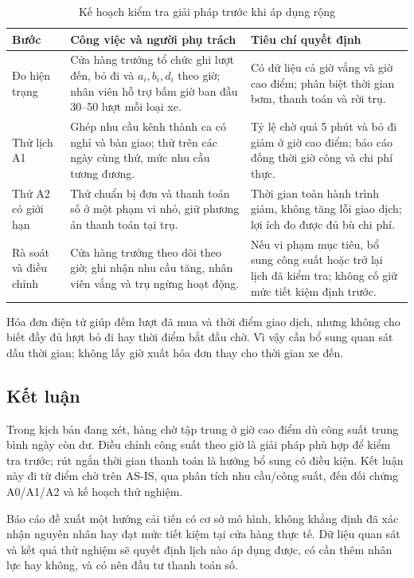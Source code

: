 \begin{table}[htbp]\centering\small
\caption{Kế hoạch kiểm tra giải pháp trước khi áp dụng rộng}\label{r3:pilot}
\begin{tabularx}{\linewidth}{@{}p{26mm}Y Y@{}}
\toprule
Bước & Công việc và người phụ trách & Tiêu chí quyết định \\
\midrule
Đo hiện trạng & Cửa hàng trưởng tổ chức ghi lượt đến, bỏ đi và $a_i,b_i,d_i$ theo giờ; nhân viên hỗ trợ bấm giờ ban đầu 30--50 lượt mỗi loại xe. & Có dữ liệu cả giờ vắng và giờ cao điểm; phân biệt thời gian bơm, thanh toán và rời trụ. \\
Thử lịch A1 & Ghép nhu cầu kênh thành ca có nghỉ và bàn giao; thử trên các ngày cùng thứ, mức nhu cầu tương đương. & Tỷ lệ chờ quá 5 phút và bỏ đi giảm ở giờ cao điểm; báo cáo đồng thời giờ công và chi phí thực. \\
Thử A2 có giới hạn & Thử chuẩn bị đơn và thanh toán số ở một phạm vi nhỏ, giữ phương án thanh toán tại trụ. & Thời gian toàn hành trình giảm, không tăng lỗi giao dịch; lợi ích đo được đủ bù chi phí. \\
Rà soát và điều chỉnh & Cửa hàng trưởng theo dõi theo giờ; ghi nhận nhu cầu tăng, nhân viên vắng và trụ ngừng hoạt động. & Nếu vi phạm mục tiêu, bổ sung công suất hoặc trở lại lịch đã kiểm tra; không cố giữ mức tiết kiệm định trước. \\
\bottomrule
\end{tabularx}
\end{table}
Hóa đơn điện tử giúp đếm lượt đã mua và thời điểm giao dịch, nhưng không
cho biết đầy đủ lượt bỏ đi hay thời điểm bắt đầu chờ. Vì vậy cần bổ sung
quan sát dấu thời gian; không lấy giờ xuất hóa đơn thay cho thời gian xe đến.

\subsection{Kết luận}
Trong kịch bản đang xét, hàng chờ tập trung ở giờ cao điểm dù công suất
trung bình ngày còn dư. Điều chỉnh công suất theo giờ là giải pháp phù hợp
để kiểm tra trước; rút ngắn thời gian thanh toán là hướng bổ sung có điều
kiện. Kết luận này đi từ điểm chờ trên AS-IS, qua phân tích nhu cầu/công
suất, đến đối chứng A0/A1/A2 và kế hoạch thử nghiệm.

Báo cáo đề xuất một hướng cải tiến có cơ sở mô hình, không khẳng định đã
xác nhận nguyên nhân hay đạt mức tiết kiệm tại cửa hàng thực tế. Dữ liệu
quan sát và kết quả thử nghiệm sẽ quyết định lịch nào áp dụng được, có cần
thêm nhân lực hay không, và có nên đầu tư thanh toán số.

